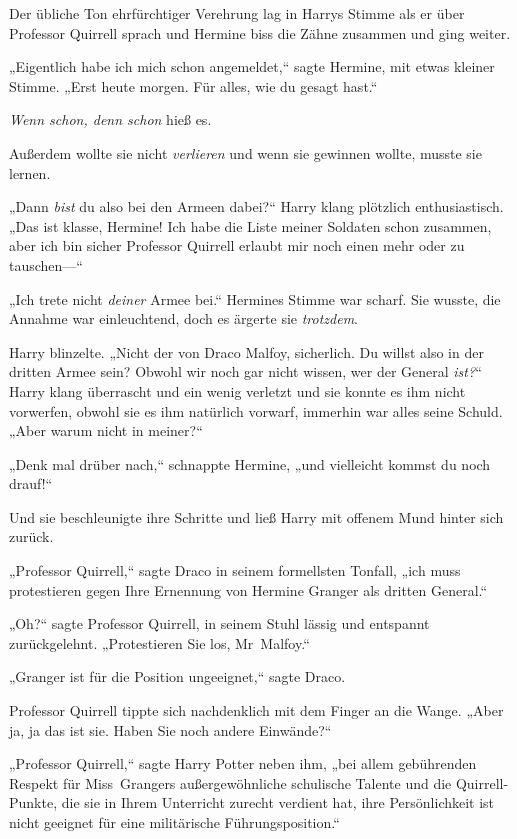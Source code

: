 {Der übliche Ton ehrfürchtiger Verehrung lag in Harrys Stimme als er über Professor Quirrell sprach und Hermine biss die Zähne zusammen und ging weiter.

„Eigentlich habe ich mich schon angemeldet,“ sagte Hermine, mit etwas kleiner Stimme. „Erst heute morgen. Für alles, wie du gesagt hast.“

\emph{Wenn schon, denn schon} hieß es.

Außerdem wollte sie nicht \emph{verlieren} und wenn sie gewinnen wollte, musste sie lernen.

„Dann \emph{bist} du also bei den Armeen dabei?“ Harry klang plötzlich enthusiastisch. „Das ist klasse, Hermine! Ich habe die Liste meiner Soldaten schon zusammen, aber ich bin sicher Professor Quirrell erlaubt mir noch einen mehr oder zu tauschen—“

„Ich trete nicht \emph{deiner} Armee bei.“ Hermines Stimme war scharf. Sie wusste, die Annahme war einleuchtend, doch es ärgerte sie \emph{trotzdem}.

Harry blinzelte. „Nicht der von Draco Malfoy, sicherlich. Du willst also in der dritten Armee sein? Obwohl wir noch gar nicht wissen, wer der General \emph{ist?}“ Harry klang überrascht und ein wenig verletzt und sie konnte es ihm nicht vorwerfen, obwohl sie es ihm natürlich vorwarf, immerhin war alles seine Schuld. „Aber warum nicht in meiner?“

„Denk mal drüber nach,“ schnappte Hermine, „und vielleicht kommst du noch drauf!“

Und sie beschleunigte ihre Schritte und ließ Harry mit offenem Mund hinter sich zurück.

\later

„Professor Quirrell,“ sagte Draco in seinem formellsten Tonfall, „ich muss protestieren gegen Ihre Ernennung von Hermine Granger als dritten General.“

„Oh?“ sagte Professor Quirrell, in seinem Stuhl lässig und entspannt zurückgelehnt. „Protestieren Sie los, Mr~Malfoy.“

„Granger ist für die Position ungeeignet,“ sagte Draco.

Professor Quirrell tippte sich nachdenklich mit dem Finger an die Wange. „Aber ja, ja das ist sie. Haben Sie noch andere Einwände?“

„Professor Quirrell,“ sagte Harry Potter neben ihm, „bei allem gebührenden Respekt für Miss~Grangers außergewöhnliche schulische Talente und die Quirrell-Punkte, die sie in Ihrem Unterricht zurecht verdient hat, ihre Persönlichkeit ist nicht geeignet für eine militärische Führungsposition.“

}
